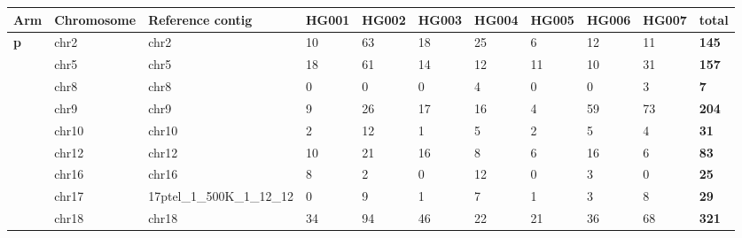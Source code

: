 \begin{samepage} \begin{table}[h!] \small \begin{tabular}{lllllllllll}
\hline
\textbf{Arm}   & \textbf{Chromosome} & \textbf{Reference contig}       & \textbf{HG001} & \textbf{HG002} & \textbf{HG003} & \textbf{HG004} & \textbf{HG005} & \textbf{HG006} & \textbf{HG007} & \textbf{total} \\
\hline
\textbf{p}     & chr2                & chr2                            & 10             & 63             & 18             & 25             & 6              & 12             & 11             & \textbf{145}   \\
\textbf{}      & chr5                & chr5                            & 18             & 61             & 14             & 12             & 11             & 10             & 31             & \textbf{157}   \\
\textbf{}      & chr8                & chr8                            & 0              & 0              & 0              & 4              & 0              & 0              & 3              & \textbf{7}     \\
\textbf{}      & chr9                & chr9                            & 9              & 26             & 17             & 16             & 4              & 59             & 73             & \textbf{204}   \\
\textbf{}      & chr10               & chr10                           & 2              & 12             & 1              & 5              & 2              & 5              & 4              & \textbf{31}    \\
\textbf{}      & chr12               & chr12                           & 10             & 21             & 16             & 8              & 6              & 16             & 6              & \textbf{83}    \\
\textbf{}      & chr16               & chr16                           & 8              & 2              & 0              & 12             & 0              & 3              & 0              & \textbf{25}    \\
\textbf{}      & chr17               & 17ptel\_1\_500K\_1\_12\_12      & 0              & 9              & 1              & 7              & 1              & 3              & 8              & \textbf{29}    \\
\textbf{}      & chr18               & chr18                           & 34             & 94             & 46             & 22             & 21             & 36             & 68             & \textbf{321}   \\

\end{tabular}
\end{table}
\end{samepage}
